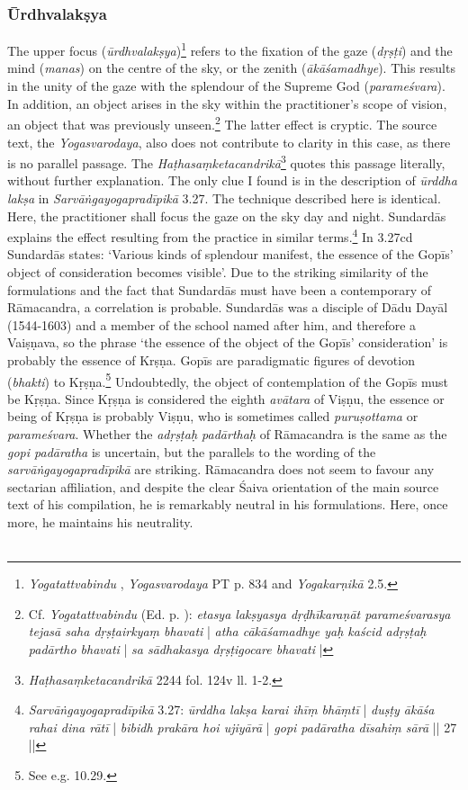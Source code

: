 \subsubsection{Ūrdhvalakṣya}
The upper focus (\textit{ūrdhvalakṣya})\footnote{\emph{Yogatattvabindu} , \emph{Yogasvarodaya} PT p. 834 and \emph{Yogakarṇikā} 2.5.} refers to the fixation of the gaze (\textit{dṛṣṭi}) and the mind (\textit{manas}) on the centre of the sky, or the zenith (\textit{ākāśamadhye}). This results in the unity of the gaze with the splendour of the Supreme God (\textit{parameśvara}). In addition, an object arises in the sky within the practitioner’s scope of vision, an object that was previously unseen.\footnote{Cf. \textit{Yogatattvabindu}  (Ed. p. \pageref{urdhvalaksya}): \textit{etasya lakṣyasya dṛḍhīkaraṇāt parameśvarasya tejasā saha dṛṣṭairkyaṃ bhavati} | \textit{atha cākāśamadhye yaḥ kaścid adṛṣṭaḥ padārtho bhavati} | \textit{sa sādhakasya dṛṣṭigocare bhavati} |} The latter effect is cryptic. The source text, the \textit{Yogasvarodaya}, also does not contribute to clarity in this case, as there is no parallel passage. The \textit{Haṭhasaṃketacandrikā}\footnote{\textit{Haṭhasaṃketacandrikā} 2244 fol. 124v ll. 1-2.} quotes this passage literally, without further explanation. The only clue I found is in the description of \textit{ūrddha lakṣa} in \textit{Sarvāṅgayogapradīpikā} 3.27. The technique described here is identical. Here, the practitioner shall focus the gaze on the sky day and night. Sundardās explains the effect resulting from the practice in similar terms.\footnote{\textit{Sarvāṅgayogapradīpikā} 3.27: \textit{ūrddha lakṣa karai ihīṃ bhāṃtī} | \textit{duṣṭy ākāśa rahai dina rātī} | \textit{bibidh prakāra hoi ujiyārā} | \textit{gopi padāratha dīsahiṃ sārā} || 27 ||} In 3.27cd Sundardās states: `Various kinds of splendour manifest, the essence of the Gopīs’ object of consideration becomes visible’. Due to the striking similarity of the formulations and the fact that Sundardās must have been a contemporary of Rāmacandra, a correlation is probable. Sundardās was a disciple of Dādu Dayāl (1544-1603) and a member of the school named after him, and therefore a Vaiṣṇava, so the phrase ‘the essence of the object of the Gopīs’ consideration’ is probably the essence of Krṣṇa. Gopīs are paradigmatic figures of devotion (\textit{bhakti}) to Kṛṣṇa.\footnote{See e.g.  10.29.} Undoubtedly, the object of contemplation of the Gopīs must be Kṛṣṇa. Since Kṛṣṇa is considered the eighth \textit{avātara} of Viṣṇu, the essence or being of Kṛṣṇa is probably Viṣṇu, who is sometimes called \textit{puruṣottama} or \textit{parameśvara}. Whether the \textit{adṛṣṭaḥ padārthaḥ} of Rāmacandra is the same as the \textit{gopi padāratha} is uncertain, but the parallels to the wording of the \textit{sarvāṅgayogapradīpikā} are striking. Rāmacandra does not seem to favour any sectarian affiliation, and despite the clear Śaiva orientation of the main source text of his compilation, he is remarkably neutral in his formulations. Here, once more, he maintains his neutrality.\\\ 

